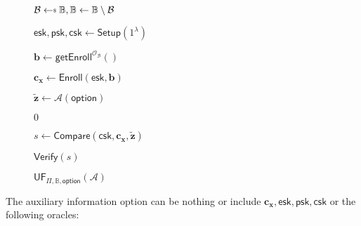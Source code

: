 \begin{figure}[h]
\centering
	\begin{minipage}[t]{0.6\linewidth}
	\centering
	\begin{algorithm}[H]
	\caption{$\textsf{UF}_{\Pi, \mathbb{B}, \textsf{option}}(\mathcal{A})$}
	\label{alg:uf_game}
	\begin{algorithmic}[1]
		\State $\mathcal{B} \getsdollar \mathbb{B}, \mathbb{B} \gets \mathbb{B} \setminus \mathcal{B}$

		\State $\textsf{esk}, \textsf{psk}, \textsf{csk} \gets \textsf{Setup}(1^\lambda)$
		
		\State $\mathbf{b} \gets \textsf{getEnroll}^{\mathcal{O}_{\mathcal{B}}}()$

		\State $\mathbf{c_x} \gets \textsf{Enroll}(\textsf{esk}, \mathbf{b})$
		
		\State ${\mathbf{\tilde{z}}} \gets \mathcal{A} ( \textsf{option} )$
 
			
			\State \Return $0$
		
		\EndIf

		\State $s \gets \textsf{Compare}( \textsf{csk}, \mathbf{c_x}, \mathbf{\tilde{z}} )$

		\State \Return $\textsf{Verify}(s)$
	\end{algorithmic}
	\end{algorithm}
	\end{minipage}
	
\label{fig:uf_game}
\end{figure}

The auxiliary information \textsf{option} can be nothing or include $\mathbf{c_x}, \textsf{esk}, \textsf{psk}, \textsf{csk}$ or the following oracles:

